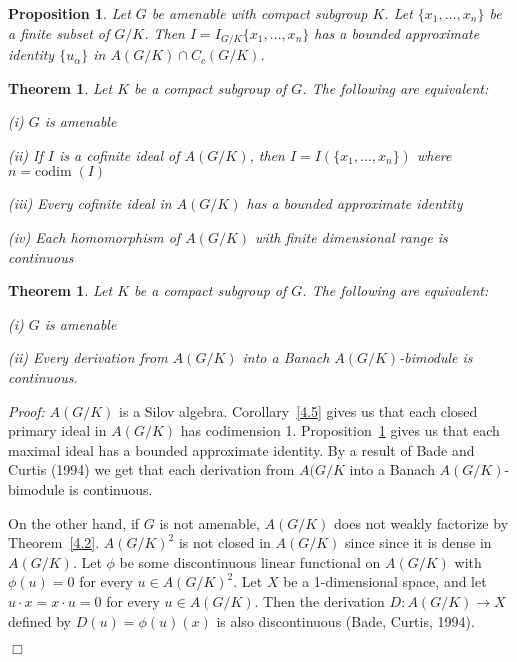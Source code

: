 \documentclass[12 pt]{article}
\newcommand\done{\begin{flushright}$\Box$\end{flushright}}
\newtheorem{theorem}[defn]{Theorem}
\newtheorem{prop}[defn]{Proposition}
\begin{document}
\begin{prop}\label{4.6}
Let $G$ be amenable with compact subgroup $K$.  Let $\{x_1 ,\ldots ,x_n\}$ be a finite
subset of $G/K$.  Then $I = I_{G/K} \{x_1 ,\ldots ,x_n\}$ has a bounded approximate
identity $\{u_\alpha\}$ in $A(G/K) \cap C_c (G/K)$.
\end{prop}


\begin{theorem}
Let $K$ be a compact subgroup of $G$.  The following are equivalent:
\begin{list}{}{\topsep -4pt \itemsep -4pt}
\item[(i)] $G$ is amenable
\item[(ii)] If $I$ is a cofinite ideal of $A(G/K)$, then $I=I(\{x_1 ,\ldots ,x_n\})$ where $n=\text{codim}\;(I)$
\item[(iii)] Every cofinite ideal in $A(G/K)$ has a bounded approximate identity
\item[(iv)] Each homomorphism of $A(G/K)$ with finite dimensional range is continuous
\end{list}
\end{theorem}


\begin{theorem}\label{4.8}
Let $K$ be a compact subgroup of $G$.  The following are equivalent:
\begin{list}{}{\topsep -4pt \itemsep -4pt}
\item[(i)] $G$ is amenable
\item[(ii)] Every derivation from $A(G/K)$ into a Banach $A(G/K)$-bimodule is continuous.
\end{list}
\end{theorem}
{\it Proof:}  $A(G/K)$ is a Silov algebra.  Corollary~\ref{4.5} gives us that each closed
primary ideal in $A(G/K)$ has codimension 1.  Proposition~\ref{4.6} gives us that
each maximal ideal has a bounded approximate identity.  By a result of Bade and Curtis (1994) we
get that each derivation from $A(G/K$ into a Banach $A(G/K)$-bimodule is continuous.

On the other hand, if $G$ is not amenable, $A(G/K)$ does not weakly factorize by Theorem~\ref{4.2}.
$A(G/K)^2$ is not closed in $A(G/K)$ since since it is dense in $A(G/K)$.  Let $\phi$ be some
discontinuous linear functional on $A(G/K)$ with $\phi(u)=0$ for every $u\in A(G/K)^2$.  Let $X$
be a 1-dimensional space, and let $u\cdot x = x\cdot u = 0$ for every $u\in A(G/K)$.
Then the derivation $D: A(G/K) \rightarrow X$ defined by $D(u) = \phi(u)(x)$ is also discontinuous
(Bade, Curtis, 1994).
\done
\end{document}
